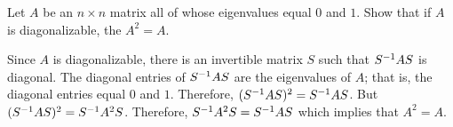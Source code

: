 \documentclass{ximera}
\begin{document}
\begin{exercise} \label{c10.3.6D}
Let $A$ be an $n\times n$ matrix all of whose eigenvalues equal $0$ and $1$. 
Show that if $A$ is diagonalizable, the $A^2=A$.

\begin{solution}
\soln
Since $A$ is diagonalizable, there is an invertible matrix $S$ such 
that $S^{-1} AS$ is diagonal.  The diagonal entries of  $S^{-1} AS$ are the eigenvalues
of $A$; that is, the diagonal entries equal $0$ and $1$.  Therefore, 
$(S^{-1} AS)^2=S^{-1} AS$.  But $(S^{-1} AS)^2 = S^{-1} A^2 S$.   Therefore, 
$S^{-1} A^2 S= S^{-1} AS$ which implies that $A^2=A$.

\end{solution}
\end{exercise}
\end{document}
